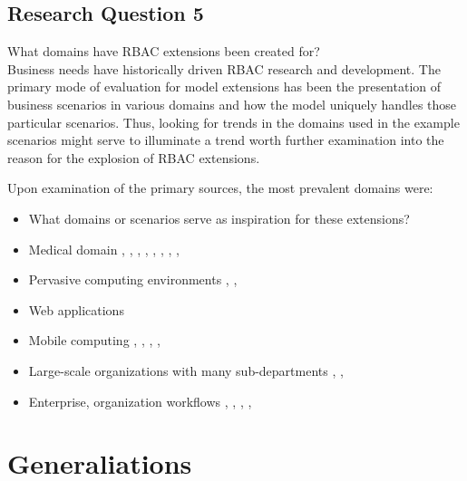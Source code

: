 \subsection{Research Question 5}

What domains have RBAC extensions been created for? \\

Business needs have historically driven RBAC research and development.  The primary mode of evaluation for
model extensions has been the presentation of business scenarios in various domains and how the model
uniquely handles those particular scenarios.  Thus, looking for trends in the domains used in the example
scenarios might serve to illuminate a trend worth further examination into the reason for the explosion of
RBAC extensions.

Upon examination of the primary sources, the most prevalent domains were:

\begin{itemize}
\setlength{\itemsep}{0.25pt}
\item What domains or scenarios serve as inspiration for these extensions?
\item Medical domain \cite{alam06:constraint}, \cite{tzelepi01:flexible}, \cite{motta03:contextual}, \cite{ni2010privacy}, \cite{damiani2007geo}, \cite{hansen2003spatial}, \cite{samuel07:spatio-temporal}, \cite{aich09:role}, \cite{zhou2007team}
\item Pervasive computing environments \cite{huang06:pervasive}, \cite{chen08:spatio-temporal}, \cite{ray07:spatio}
\item Web applications \cite{masoumzadeh2008purbac}
\item Mobile computing \cite{thein2011leveraging}, \cite{zou2009crbac}, \cite{chandran05:llt}, \cite{ray07:spatio}, \cite{aich09:role}
\item Large-scale organizations with many sub-departments \cite{yamazaki04:designing}, \cite{han08:extended}, \cite{yao2008task}
\item Enterprise, organization workflows \cite{cholewka00:acontext-sensitive}, \cite{bao08:role}, \cite{zhang06:collaborative}, \cite{oh2003task}, \cite{joshi05:generalized}
\end{itemize}


\section{Generaliations} \label{sec:generalizations}

